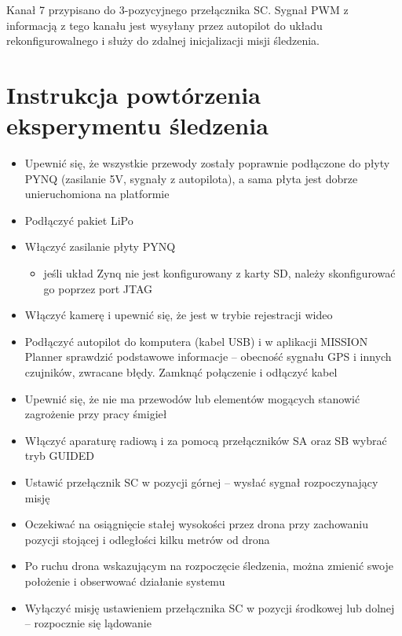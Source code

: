 Kanał 7 przypisano do 3-pozycyjnego przełącznika SC. Sygnał PWM z informacją z tego kanału jest wysyłany przez autopilot do układu rekonfigurowalnego i służy do zdalnej inicjalizacji misji śledzenia.


\section{Instrukcja powtórzenia eksperymentu śledzenia}

\begin{itemize}
	\item Upewnić się, że wszystkie przewody zostały poprawnie podłączone do płyty PYNQ (zasilanie 5V, sygnały z autopilota), a sama płyta jest dobrze unieruchomiona na platformie
	\item Podłączyć pakiet LiPo
	\item Włączyć zasilanie płyty PYNQ
	\begin{itemize}
		\item jeśli układ Zynq nie jest konfigurowany z karty SD, należy skonfigurować go poprzez port JTAG
	\end{itemize}	
	\item Włączyć kamerę i upewnić się, że jest w trybie rejestracji wideo
	\item Podłączyć autopilot do komputera (kabel USB) i w aplikacji MISSION Planner sprawdzić podstawowe informacje -- obecność sygnału GPS i innych czujników, zwracane błędy. Zamknąć połączenie i odłączyć kabel
	\item Upewnić się, że nie ma przewodów lub elementów mogących stanowić zagrożenie przy pracy śmigieł
	\item Włączyć aparaturę radiową i za pomocą przełączników SA oraz SB wybrać tryb GUIDED
	\item Ustawić przełącznik SC w pozycji górnej -- wysłać sygnał rozpoczynający misję 
	\item Oczekiwać na osiągnięcie stałej wysokości przez drona przy zachowaniu pozycji stojącej i odległości kilku metrów od drona
	\item Po ruchu drona wskazującym na rozpoczęcie śledzenia, można zmienić swoje położenie i obserwować działanie systemu 
	\item Wyłączyć misję ustawieniem przełącznika SC w pozycji środkowej lub dolnej -- rozpocznie się lądowanie 
\end{itemize}